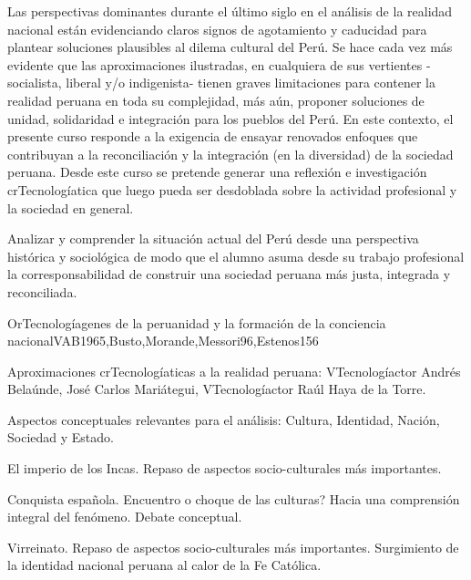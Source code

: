 \begin{syllabus}


\begin{justification}
Las perspectivas dominantes durante el último siglo en el análisis de la realidad nacional están evidenciando claros signos de agotamiento y caducidad para plantear soluciones plausibles al dilema cultural del Perú. Se hace cada vez más evidente que las aproximaciones ilustradas, en cualquiera de sus  vertientes -socialista, liberal y/o indigenista- tienen graves limitaciones para contener la realidad peruana en toda su complejidad, más aún, proponer soluciones de unidad, solidaridad e integración para los pueblos del Perú. 
En este contexto, el presente curso responde a la exigencia de ensayar renovados enfoques que contribuyan a la reconciliación y la integración (en la diversidad) de la sociedad peruana. Desde este curso se pretende generar una reflexión e investigación crTecnologíatica que luego pueda ser desdoblada sobre la actividad profesional y la sociedad en general.
\end{justification}

\begin{goals}
\item Analizar y comprender la situación actual del Perú desde una perspectiva histórica y sociológica de modo que el alumno asuma desde su trabajo profesional la corresponsabilidad de construir una sociedad peruana más justa, integrada y reconciliada.
\end{goals}

\begin{outcomes}
\end{outcomes}

\begin{unit}{OrTecnologíagenes de la peruanidad y la formación de la conciencia nacional}{VAB1965,Busto,Morande,Messori96,Estenos}{15}{6}
\begin{topics}
	\item Aproximaciones crTecnologíaticas a la realidad peruana: VTecnologíactor Andrés Belaúnde, José Carlos Mariátegui, VTecnologíactor Raúl Haya de la Torre.
	\item Aspectos conceptuales relevantes para el análisis: Cultura, Identidad, Nación, Sociedad y Estado. 
	\item El imperio de los Incas. Repaso de  aspectos socio-culturales más importantes. 
	\item Conquista española. Encuentro o choque de las culturas? Hacia una comprensión integral del fenómeno. Debate conceptual. 
	\item Virreinato. Repaso de  aspectos socio-culturales más importantes. Surgimiento de la identidad nacional peruana al calor de la Fe Católica.  


\end{topics}
\end{unit}
\end{syllabus}
